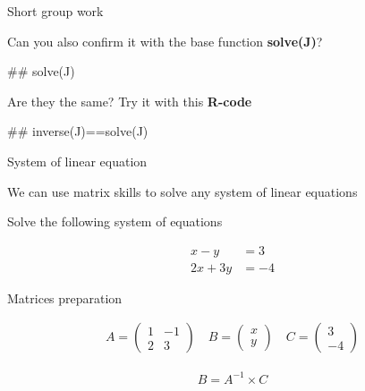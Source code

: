 \documentclass[ignorenonframetext,]{beamer}
\newenvironment{Shaded}{\begin{snugshade}}{\end{snugshade}}
\newcommand{\NormalTok}[1]{#1}
\begin{document}
\begin{frame}[fragile]{Short group work}

Can you also confirm it with the base function \textbf{solve(J)}?

\begin{Shaded}
\begin{Highlighting}[]
\NormalTok{## solve(J)}
\end{Highlighting}
\end{Shaded}

Are they the same? Try it with this \textbf{R-code}

\begin{Shaded}
\begin{Highlighting}[]
\NormalTok{## inverse(J)==solve(J)}
\end{Highlighting}
\end{Shaded}

\end{frame}

\begin{frame}{System of linear equation}

We can use matrix skills to solve any system of linear equations

\begin{block}{Solve the following system of equations}

\begin{align*}
x-y &= 3\\
2x +3y &= -4
\end{align*}

\end{block}

\begin{block}{Matrices preparation}

\begin{align*}
A=\begin{pmatrix}
1&-1\\
2&3
\end{pmatrix}\quad B=\begin{pmatrix}
x\\
y
\end{pmatrix} \quad C=\begin{pmatrix}
3\\
-4
\end{pmatrix}
\end{align*}

\begin{align*}
B= A^{-1}\times C
\end{align*}

\end{block}

\end{frame}
\end{document}
